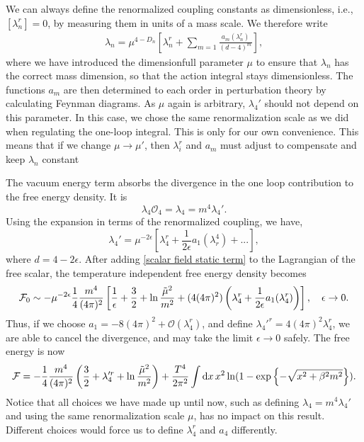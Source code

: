 We can always define the renormalized coupling constants as dimensionless, i.e., $[\lambda_n^r] = 0$, by measuring them in units of a mass scale.
We therefore write 
\begin{align*}
    \lambda_n = \mu^{4 - D_n}
    \left[
        \lambda_n^r + \sum_{m=1} \frac{a_m(\lambda_n^r)}{(d - 4)^{m}}
    \right],
\end{align*}
where we have introduced the dimensionfull parameter $\mu$ to ensure that $\lambda_n$ has the correct mass dimension, so that the action integral stays dimensionless.
The functions $a_m$ are then determined to each order in perturbation theory by calculating Feynman diagrams.
As $\mu$ again is arbitrary, $\lambda_4'$ should not depend on this parameter.
In this case, we chose the same renormalization scale as we did when regulating the one-loop integral.
This is only for our own convenience.
This means that if we change $\mu \rightarrow \mu'$, then $\lambda_i^r$ and $a_m$ must adjust to compensate and keep $\lambda_n$ constant~

The vacuum energy term absorbs the divergence in the one loop contribution to the free energy density.
It is
\begin{equation}
    \label{scalar field static term}
    \lambda_4 \mathcal{O}_4 = \lambda_4 = m^4 \lambda_4'.
\end{equation}
Using the expansion in terms of the renormalized coupling, we have, 
\begin{equation}
    \lambda_4' = \mu^{- 2 \epsilon}\left[ \lambda_4^r + \frac{1}{2 \epsilon} a_1(\lambda_r^4) + ... \right],
\end{equation}
where $d = 4 - 2\epsilon$.
After adding \autoref{scalar field static term} to the Lagrangian of the free scalar, the temperature independent free energy density becomes
\begin{equation}
    \mathcal{F}_0 \sim - \mu^{-2 \epsilon}  \frac{1}{4} \frac{m^4}{(4 \pi)^2}  
    \left[
        \frac{1}{\epsilon} + \frac{3}{2} + \ln{\frac{\tilde \mu^2}{m^2}}
        + (4 (4 \pi)^2) \left(\lambda_4^r + \frac{1}{2\epsilon} a_1(\lambda_4^r)\right)
    \right],
    \quad \epsilon \rightarrow 0.
\end{equation}
Thus, if we choose $a_1 = -8 (4\pi)^2 + \mathcal{O}(\lambda_4^r)$, and define $\lambda_4'^r = 4(4\pi)^2\lambda_4^r$, we are able to cancel the divergence, and may take the limit $\epsilon \rightarrow 0$ safely.
The free energy is now
\begin{equation}
    \mathcal{F} = -\frac{1}{4} \frac{m^4}{(4 \pi)^2} 
    \left(
        \frac{3}{2} + \lambda_4'^r + \ln \frac{\tilde \mu^2}{m^2}
    \right)
    +
    \frac{T^4}{2\pi^2} \int \text{d} x \, x^2 \ln(1 - \text{exp} \left\{ -\sqrt{x^2 + \beta^2 m^2} \right\}).
\end{equation}
Notice that all choices we have made up until now, such as defining $\lambda_4 = m^4 \lambda_4'$ and using the same renormalization scale $\mu$, has no impact on this result.
Different choices would force us to define $\lambda_4^r$ and $a_4$ differently.

